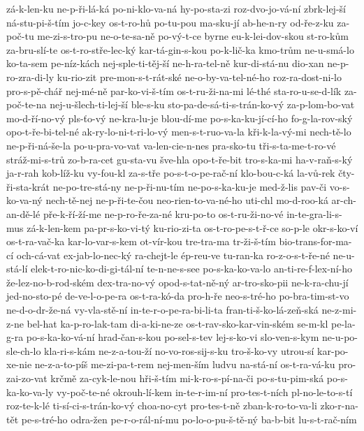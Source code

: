 zá-k-len-ku
ne-p-ři-lá-ká
po-ni-klo-va-ná
hy-po-sta-zi
roz-dvo-jo-vá-ní
zbrk-lej-ší
ná-stu-pi-š-tím
jo-c-key
os-t-ro-hů
po-tu-pou
ma-sku-jí
ab-he-n-ry
od-ře-z-ku
za-poč-tu
me-zi-s-tro-pu
ne-o-te-sa-ně
po-vý-t-ce
byrne
eu-k-lei-dov-skou
st-ro-kům
za-bru-slí-te
os-t-ro-stře-lec-ký
kar-tá-gin-s-kou
po-k-lič-ka
kmo-trům
ne-u-smá-lo
ko-ta-sem
pe-níz-kách
nej-sple-ti-těj-ší
ne-h-ra-tel-ně
kur-di-stá-nu
dio-xan
ne-p-ro-zra-di-ly
ku-rio-zit
pre-mon-s-t-rát-ské
ne-o-by-va-tel-né-ho
roz-ra-dost-ni-lo
pro-s-pě-chář
nej-mé-ně
par-ko-vi-š-tím
os-t-ru-ži-na-mi
lé-thé
sta-ro-u-se-d-lík
za-poč-te-na
nej-u-šlech-ti-lej-ší
ble-s-ku
sto-pa-de-sá-ti-s-trán-ko-vý
za-p-lom-bo-vat
mo-d-ří-no-vý
pls-ťo-vý
ne-kra-lu-je
blou-dí-me
po-s-ka-ku-jí-cí-ho
fo-g-la-rov-ský
opo-t-ře-bi-tel-né
ak-ry-lo-ni-t-ri-lo-vý
men-s-t-ruo-va-la
kři-k-la-vý-mi
nech-tě-lo
ne-p-ři-ná-še-la
po-u-pra-vo-vat
va-len-cie-n-nes
pra-sko-tu
tři-s-ta-me-t-ro-vé
stráž-mi-s-trů
zo-b-ra-cet
gu-sta-vu
šve-hla
opo-t-ře-bit
tro-s-ka-mi
ha-v-raň-s-ký
ja-r-rah
kob-líž-ku
vy-fou-kl
za-s-tře
po-s-t-o-pe-rač-ní
klo-bou-c-ká
la-vů-rek
čty-ři-sta-krát
ne-po-tre-stá-ny
ne-p-ři-nu-tím
ne-po-s-ka-ku-je
med-ž-lis
pav-či
vo-s-ko-va-ný
nech-tě-nej
ne-p-ři-te-čou
neo-rien-to-va-né-ho
uti-chl
mo-d-roo-ká
ar-ch-an-dě-lé
pře-k-ří-ží-me
ne-p-ro-ře-za-né
kru-po-to
os-t-ru-ži-no-vé
in-te-gra-li-s-mus
zá-k-len-kem
pa-pr-s-ko-vi-tý
ku-rio-zi-ta
os-t-ro-pe-s-t-ř-ce
so-p-le
okr-s-ko-ví
os-t-ra-vač-ka
kar-lo-var-s-kem
ot-vír-kou
tre-tra-ma
tr-ži-š-tím
bio-trans-for-ma-cí
och-cá-vat
ex-jab-lo-nec-ký
ra-chejt-le
ép-reu-ve
tu-ran-ka
ro-z-o-s-t-ře-né
ne-u-stá-lí
elek-t-ro-nic-ko-di-gi-tál-ní
te-n-ne-s-see
po-s-ka-ko-va-lo
an-ti-re-f-lex-ní-ho
že-lez-no-b-rod-ském
dex-tra-no-vý
opod-s-tat-ně-ný
ar-tro-sko-pii
ne-k-ra-chu-jí
jed-no-sto-pé
de-ve-l-o-pe-ra
os-t-ra-kó-da
pro-h-ře
neo-s-tré-ho
po-bra-tim-st-vo
ne-d-o-dr-že-ná
vy-vla-stě-ní
in-te-r-o-pe-ra-bi-li-ta
fran-ti-š-ko-lá-zeň-ská
ne-z-mi-z-ne
bel-hat
ka-p-ro-lak-tam
di-a-ki-ne-ze
os-t-rav-sko-kar-vin-ském
se-m-kl
pe-la-g-ra
po-s-ka-ko-vá-ní
hrad-čan-s-kou
po-sel-s-tev
lej-s-ko-vi
slo-ven-s-kym
ne-u-po-sle-ch-lo
kla-ri-s-kám
ne-z-a-tou-ží
no-vo-ros-sij-s-ku
tro-š-ko-vy
utrou-sí
kar-po-xe-nie
ne-z-a-to-píš
me-zi-pa-t-rem
nej-men-ším
ludvu
na-stá-ní
os-t-ra-vá-ku
pro-zai-zo-vat
krčmě
za-cyk-le-nou
hři-š-tím
mi-k-ro-s-pí-na-či
po-s-tu-pim-ská
po-s-ka-ko-va-ly
vy-poč-te-né
okrouh-lí-kem
in-te-r-im-ní
pro-tes-t-ních
pl-no-le-to-s-tí
roz-te-k-lé
ti-sí-ci-s-trán-ko-vý
choa-no-cyt
pro-tes-t-ně
zban-k-ro-to-va-li
zko-r-na-tět
pe-s-tré-ho
odra-žen
pe-r-o-rál-ní-mu
po-lo-o-pu-š-tě-ný
ba-b-bit
lu-s-t-rač-ním

